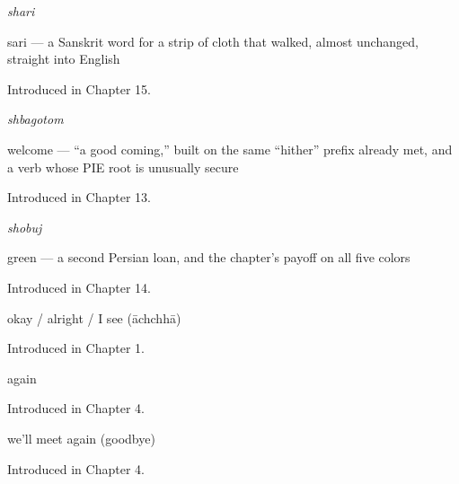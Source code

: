 \noindent\begin{minipage}[t]{\linewidth}
\raggedright
\textbf{}\enspace\emph{shari}\par
\small sari — a Sanskrit word for a strip of cloth that walked, almost unchanged, straight into English\par
\footnotesize Introduced in Chapter 15.
\end{minipage}\par\medskip

\noindent\begin{minipage}[t]{\linewidth}
\raggedright
\textbf{}\enspace\emph{shbagotom}\par
\small welcome — \textquotedblleft{}a good coming,\textquotedblright{} built on the same \textquotedblleft{}hither\textquotedblright{} prefix already met, and a verb whose PIE root is unusually secure\par
\footnotesize Introduced in Chapter 13.
\end{minipage}\par\medskip

\noindent\begin{minipage}[t]{\linewidth}
\raggedright
\textbf{}\enspace\emph{shobuj}\par
\small green — a second Persian loan, and the chapter's payoff on all five colors\par
\footnotesize Introduced in Chapter 14.
\end{minipage}\par\medskip

\noindent\begin{minipage}[t]{\linewidth}
\raggedright
\textbf{}\par
\small okay / alright / I see (āchchhā)\par
\footnotesize Introduced in Chapter 1.
\end{minipage}\par\medskip

\noindent\begin{minipage}[t]{\linewidth}
\raggedright
\textbf{}\par
\small again\par
\footnotesize Introduced in Chapter 4.
\end{minipage}\par\medskip

\noindent\begin{minipage}[t]{\linewidth}
\raggedright
\textbf{  }\par
\small we'll meet again (goodbye)\par
\footnotesize Introduced in Chapter 4.
\end{minipage}\par\medskip

